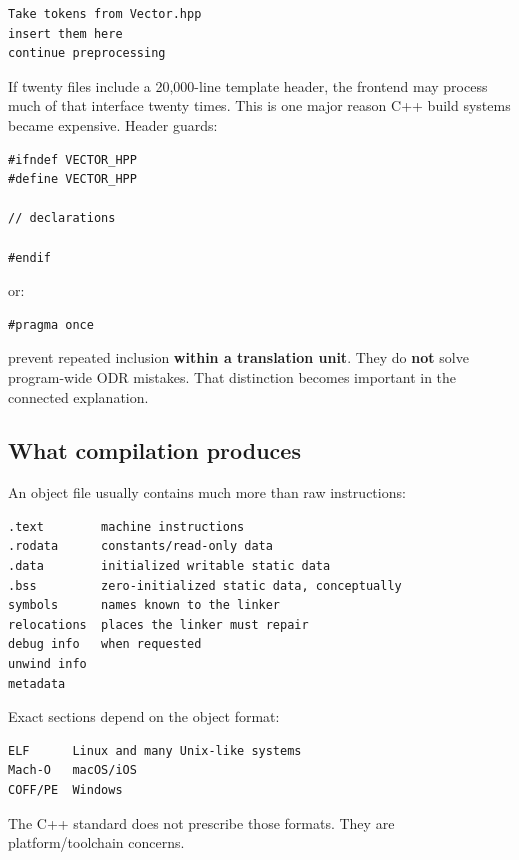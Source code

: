 \begin{verbatim}
Take tokens from Vector.hpp
insert them here
continue preprocessing
\end{verbatim}

If twenty  files include a 20,000-line template header, the frontend may process much of that interface twenty times. This is one major reason C++ build systems became expensive. Header guards:

\begin{verbatim}
#ifndef VECTOR_HPP
#define VECTOR_HPP

// declarations

#endif
\end{verbatim}

or:

\begin{verbatim}
#pragma once
\end{verbatim}

prevent repeated inclusion \textbf{within a translation unit}. They do \textbf{not} solve program-wide ODR mistakes. That distinction becomes important in the connected explanation.

\subsection{What compilation produces}\label{05-engine-i-ch002-what-compilation-produces}

\hypertarget{05-engine-i-ch002-what-compilation-produces}{}

An object file usually contains much more than raw instructions:

\begin{verbatim}
.text        machine instructions
.rodata      constants/read-only data
.data        initialized writable static data
.bss         zero-initialized static data, conceptually
symbols      names known to the linker
relocations  places the linker must repair
debug info   when requested
unwind info
metadata
\end{verbatim}

Exact sections depend on the object format:

\begin{verbatim}
ELF      Linux and many Unix-like systems
Mach-O   macOS/iOS
COFF/PE  Windows
\end{verbatim}

The C++ standard does not prescribe those formats. They are platform/toolchain concerns.

